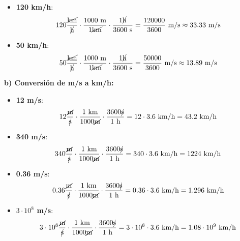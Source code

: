 \begin{exercise}
\begin{solu}
\begin{itemize}
            \item \textbf{120 km/h}:
            \[ 120 \frac{\cancel{\text{km}}}{\cancel{\text{h}}} \cdot \frac{1000 \text{ m}}{1 \cancel{\text{km}}} \cdot \frac{1 \cancel{\text{h}}}{3600 \text{ s}} = \frac{120000}{3600} \text{ m/s} \approx 33.33 \text{ m/s} \]

            \item \textbf{50 km/h}:
            \[ 50 \frac{\cancel{\text{km}}}{\cancel{\text{h}}} \cdot \frac{1000 \text{ m}}{1 \cancel{\text{km}}} \cdot \frac{1 \cancel{\text{h}}}{3600 \text{ s}} = \frac{50000}{3600} \text{ m/s} \approx 13.89 \text{ m/s} \]
        \end{itemize}

        \textbf{b) Conversión de m/s a km/h:}
        \begin{itemize}
            \item \textbf{12 m/s}:
            \[ 12 \frac{\cancel{\text{m}}}{\cancel{\text{s}}} \cdot \frac{1 \text{ km}}{1000 \cancel{\text{m}}} \cdot \frac{3600 \cancel{\text{s}}}{1 \text{ h}} = 12 \cdot 3.6 \text{ km/h} = 43.2 \text{ km/h} \]

            \item \textbf{340 m/s}:
            \[ 340 \frac{\cancel{\text{m}}}{\cancel{\text{s}}} \cdot \frac{1 \text{ km}}{1000 \cancel{\text{m}}} \cdot \frac{3600 \cancel{\text{s}}}{1 \text{ h}} = 340 \cdot 3.6 \text{ km/h} = 1224 \text{ km/h} \]

            \item \textbf{0.36 m/s}:
            \[ 0.36 \frac{\cancel{\text{m}}}{\cancel{\text{s}}} \cdot \frac{1 \text{ km}}{1000 \cancel{\text{m}}} \cdot \frac{3600 \cancel{\text{s}}}{1 \text{ h}} = 0.36 \cdot 3.6 \text{ km/h} = 1.296 \text{ km/h} \]

            \item \textbf{$3 \cdot 10^8$ m/s}:
            \[ 3 \cdot 10^8 \frac{\cancel{\text{m}}}{\cancel{\text{s}}} \cdot \frac{1 \text{ km}}{1000 \cancel{\text{m}}} \cdot \frac{3600 \cancel{\text{s}}}{1 \text{ h}} = 3 \cdot 10^8 \cdot 3.6 \text{ km/h} = 1.08 \cdot 10^9 \text{ km/h} \]
        \end{itemize}
    \end{solu}
\end{exercise}


